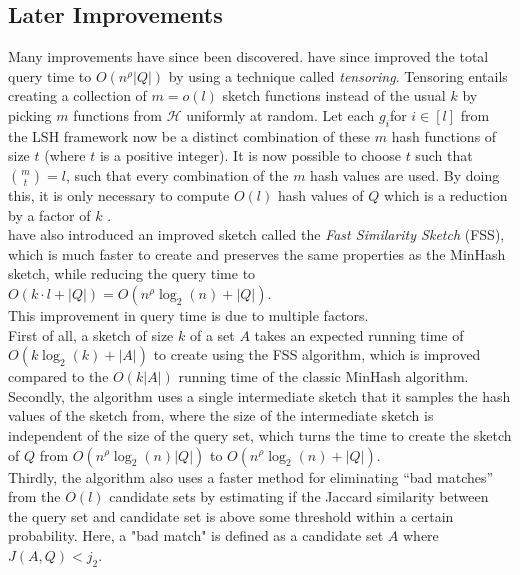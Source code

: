 \subsection{Later Improvements}
Many improvements have since been discovered.
\citet{andoni2006efficient} have since improved the total query time to $O(n^\rho|Q|)$ by using a technique called \textit{tensoring}. Tensoring entails creating a collection of $m=o(l)$ sketch functions instead of the usual $k$ by picking $m$ functions from $\mathcal{H}$ uniformly at random. Let each $g_i$for $i\in [l]$ from the LSH framework now be a distinct combination of these $m$ hash functions of size $t$ (where $t$ is a positive integer). It is now possible to choose $t$ such that ${m \choose t} = l$, such that every combination of the $m$ hash values are used. By doing this, it is only necessary to compute $O(l)$ hash values of $Q$ which is a reduction by a factor of $k$ \cite{andoni2006efficient}\cite{christiani2018fast}.\\
\citet{dahlgaard2017fast} have also introduced an improved sketch called the \textit{Fast Similarity Sketch} (FSS), which is much faster to create and preserves the same properties as the MinHash sketch, while reducing the query time to $O(k\cdot l + |Q|)=O(n^\rho \log_2(n) + |Q|)$. \\
This improvement in query time is due to multiple factors.\\
First of all, a sketch of size $k$ of a set $A$ takes an expected running time of $O(k\log_2(k) + |A|)$ to create using the FSS algorithm, which is improved compared to the $O(k|A|)$ running time of the classic MinHash algorithm.\\
Secondly, the algorithm uses a single intermediate sketch that it samples the hash values of the sketch from, where the size of the intermediate sketch is independent of the size of the query set, which turns the time to create the sketch of $Q$ from $O(n^\rho \log_2(n)|Q|)$ to $O(n^\rho \log_2(n) + |Q|)$.\\
Thirdly, the algorithm also uses a faster method for eliminating ``bad matches'' from the $O(l)$ candidate sets by estimating if the Jaccard similarity between the query set and candidate set is above some threshold within a certain probability. Here, a "bad match" is defined as a candidate set $A$ where $J(A, Q) < j_2$.
